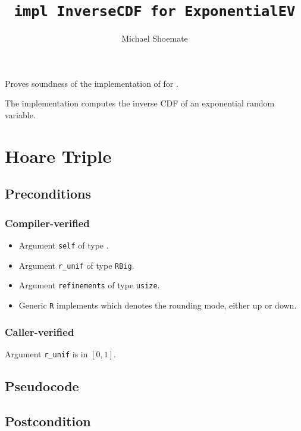 \documentclass{article}
\title{\texttt{impl InverseCDF for ExponentialEV}}
\author{Michael Shoemate}
\begin{document}
\maketitle

\contrib

Proves soundness of the implementation of  
for .

The implementation computes the inverse CDF of an exponential random variable.

\section{Hoare Triple}

\subsection*{Preconditions}
\subsubsection*{Compiler-verified}
\begin{itemize}
    \item Argument \texttt{self} of type .
    \item Argument \texttt{r\_unif} of type \texttt{RBig}.
    \item Argument \texttt{refinements} of type \texttt{usize}.
    \item Generic \texttt{R} implements  which denotes the rounding mode, either up or down.
\end{itemize}

\subsubsection*{Caller-verified}
Argument \texttt{r\_unif} is in $[0, 1]$.

\subsection*{Pseudocode}



\subsection*{Postcondition}
\end{document}
